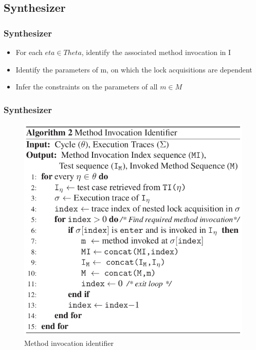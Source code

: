 \documentclass{beamer}
\begin{document}
\subsection{Synthesizer}
\begin{frame}
\frametitle{Synthesizer}
\begin{itemize}
 \item For each $eta \in Theta$, identify the associated method invocation in I
 \item Identify the parameters of m, on which the lock acquisitions are dependent
 \item Infer the constraints on the parameters of all  $m \in M$
\end{itemize}

\end{frame}

\begin{frame}
\frametitle{Synthesizer}
\begin{figure}[ht!]
     
           \includegraphics[scale = 0.3]{Images/mi_identifier}
       
    \caption{%
        Method invocation identifier
     }%
   \label{fig:subfigures}
\end{figure}
\end{frame}
\end{document}
